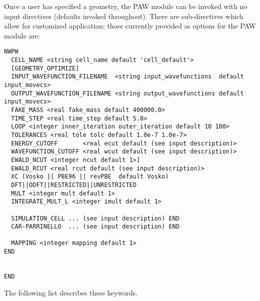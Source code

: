 Once a user has specified a geometry, the PAW module can be invoked with no input directives (defaults invoked throughout).  There are sub-directives which allow for customized application; those currently provided as options for the PAW module are:
\begin{verbatim}
NWPW
  CELL_NAME <string cell_name default 'cell_default'>  
  [GEOMETRY_OPTIMIZE]
  INPUT_WAVEFUNCTION_FILENAME  <string input_wavefunctions  default input_movecs>
  OUTPUT_WAVEFUNCTION_FILENAME <string output_wavefunctions default input_movecs>
  FAKE_MASS <real fake_mass default 400000.0>
  TIME_STEP <real time_step default 5.8>
  LOOP <integer inner_iteration outer_iteration default 10 100>
  TOLERANCES <real tole tolc default 1.0e-7 1.0e-7>
  ENERGY_CUTOFF       <real ecut default (see input description)>
  WAVEFUNCTION_CUTOFF <real wcut default (see input description)>
  EWALD_NCUT <integer ncut default 1>]
  EWALD_RCUT <real rcut default (see input description)>
  XC (Vosko || PBE96 || revPBE  default Vosko)
  DFT||ODFT||RESTRICTED||UNRESTRICTED
  MULT <integer mult default 1>
  INTEGRATE_MULT_L <integer imult default 1>
  
  SIMULATION_CELL ... (see input description) END
  CAR-PARRINELLO  ... (see input description) END

  MAPPING <integer mapping default 1>
END 


END 
\end{verbatim}
The following list describes these keywords.
